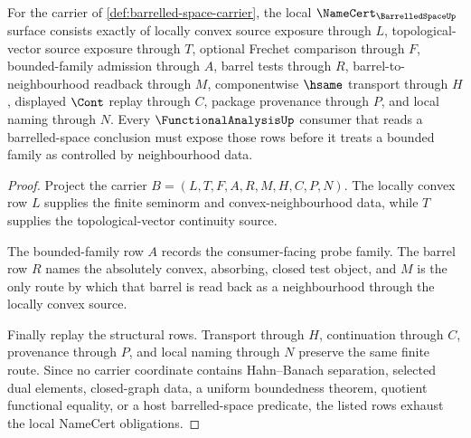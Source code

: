 \begin{theorem}
\label{thm:barrelled-space-namecert-obligations}
For the carrier of \autoref{def:barrelled-space-carrier}, the local $\NameCert_{\BarrelledSpaceUp}$ surface consists exactly of locally convex source exposure through $L$, topological-vector source exposure through $T$, optional Frechet comparison through $F$, bounded-family admission through $A$, barrel tests through $R$, barrel-to-neighbourhood readback through $M$, componentwise $\hsame$ transport through $H$, displayed $\Cont$ replay through $C$, package provenance through $P$, and local naming through $N$. Every $\FunctionalAnalysisUp$ consumer that reads a barrelled-space conclusion must expose those rows before it treats a bounded family as controlled by neighbourhood data.
\end{theorem}
\begin{proof}
Project the carrier $B=(L,T,F,A,R,M,H,C,P,N)$. The locally convex row $L$ supplies the finite seminorm and convex-neighbourhood data, while $T$ supplies the topological-vector continuity source.

The bounded-family row $A$ records the consumer-facing probe family. The barrel row $R$ names the absolutely convex, absorbing, closed test object, and $M$ is the only route by which that barrel is read back as a neighbourhood through the locally convex source.

Finally replay the structural rows. Transport through $H$, continuation through $C$, provenance through $P$, and local naming through $N$ preserve the same finite route. Since no carrier coordinate contains Hahn--Banach separation, selected dual elements, closed-graph data, a uniform boundedness theorem, quotient functional equality, or a host barrelled-space predicate, the listed rows exhaust the local NameCert obligations.
\end{proof}

